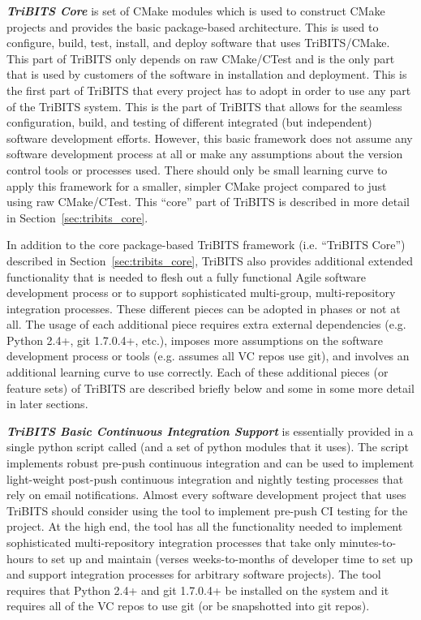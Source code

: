 \documentclass[note]{TechNote}
\begin{document}
\textbf{\textit{TriBITS Core}} is set of CMake modules which is used to construct CMake projects and provides the basic package-based architecture.  This is used to configure, build, test, install, and deploy software that uses TriBITS/CMake.  This part of TriBITS only depends on raw CMake/CTest and is the only part that is used by customers of the software in installation and deployment.  This is the first part of TriBITS that every project has to adopt in order to use any part of the TriBITS system.  This is the part of TriBITS that allows for the seamless configuration, build, and testing of different integrated (but independent) software development efforts.  However, this basic framework does not assume any software development process at all or make any assumptions about the version control tools or processes used.  There should only be small learning curve to apply this framework for a smaller, simpler CMake project compared to just using raw CMake/CTest.   This ``core'' part of TriBITS is described in more detail in Section~\ref{sec:tribits_core}.

In addition to the core package-based TriBITS framework (i.e. ``TriBITS Core'') described in Section~\ref{sec:tribits_core}, TriBITS also provides additional extended functionality that is needed to flesh out a fully functional Agile software development process or to support sophisticated multi-group, multi-repository integration processes.  These different pieces can be adopted in phases or not at all.  The usage of each additional piece requires extra external dependencies (e.g. Python 2.4+, git 1.7.0.4+, etc.), imposes more assumptions on the software development process or tools (e.g. assumes all VC repos use git), and involves an additional learning curve to use correctly.  Each of these additional pieces (or feature sets) of TriBITS are described briefly below and some in some more detail in later sections.

\textbf{\textit{TriBITS Basic Continuous Integration Support}} is essentially provided in a single python script called  (and a set of python modules that it uses).  The  script implements robust pre-push continuous integration and can be used to implement light-weight post-push continuous integration and nightly testing processes that rely on email notifications.  Almost every software development project that uses TriBITS should consider using the  tool to implement pre-push CI testing for the project.  At the  high end, the  tool has all the functionality needed to implement sophisticated multi-repository integration processes that take only minutes-to-hours to set up and maintain (verses weeks-to-months of developer time to set up and support integration processes for arbitrary software projects).    The  tool requires that Python 2.4+ and git 1.7.0.4+ be installed on the system and it requires all of the VC repos to use git (or be snapshotted into git repos).
\end{document}
